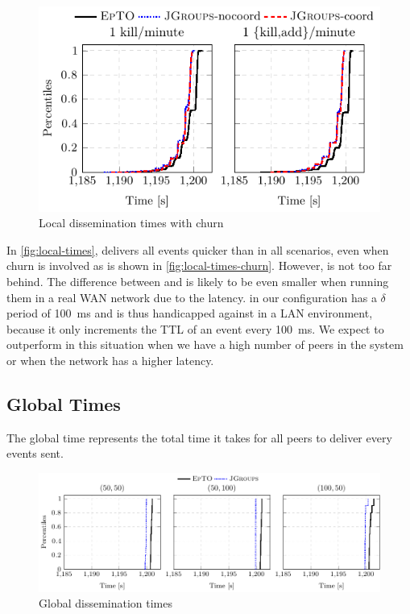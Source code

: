  \begin{figure}[hpt]
 	\centering
 	\includegraphics[width=\linewidth]{figures/local-times-synth-churn.pdf}
 	\vspace{-2mm} 
 	\caption{Local dissemination times with churn}
 	\vspace{-2mm} 
 	\label{fig:local-times-churn} 
 \end{figure}
In \autoref{fig:local-times}, \jgroups delivers all events quicker than \epto in all scenarios, even when churn is involved as is shown in \autoref{fig:local-times-churn}. However, \epto is not too far behind. The difference between \epto and \jgroups is likely to be even smaller when running them in a real WAN network due to the latency. \epto in our configuration has a $\delta$ period of \SI{100}{\milli\second} and is thus handicapped against \jgroups in a LAN environment, because it only increments the TTL of an event every \SI{100}{\milli\second}. We expect \epto to outperform \jgroups in this situation when we have a high number of peers in the system or when the network has a higher latency. 
\subsection{Global Times}
The global time represents the total time it takes for all peers to deliver every events sent.
 \begin{figure}[hpt]
 	\centering
 	\includegraphics[width=\linewidth]{figures/global-times-nochurn.pdf}
 	\vspace{-2mm} 
 	\caption{Global dissemination times}
 	\vspace{-2mm}
 	\label{fig:global-times}  
 \end{figure}

